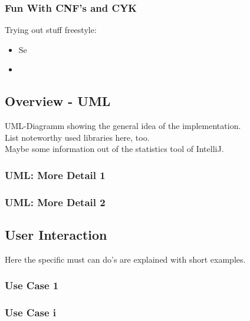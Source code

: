 \subsubsection{Fun With CNF's and CYK}
Trying out stuff freestyle:
\begin{itemize}
	\item Se
	\item 
\end{itemize}

\pagebreak
\subsection{Overview - UML}

UML-Diagramm showing the general idea of the implementation.\\
List noteworthy used libraries here, too.\\
Maybe some information out of the statistics tool of IntelliJ.

\subsubsection{UML: More Detail 1}
\subsubsection{UML: More Detail 2}

\pagebreak
\subsection{User Interaction}

\noindent Here the specific must can do's are explained with short examples.
\subsubsection{Use Case 1}
\subsubsection{Use Case i}

\pagebreak